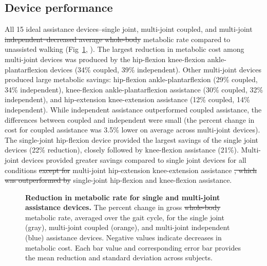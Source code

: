 \documentclass[10pt,letterpaper]{article}
\providecommand{\DIFaddtex}[1]{{\protect\color{blue}{#1}}} %
\providecommand{\DIFdeltex}[1]{{\protect\color{red}\sout{#1}}}                      %
\providecommand{\DIFaddbegin}{} %
\providecommand{\DIFaddend}{} %
\providecommand{\DIFdelbegin}{} %
\providecommand{\DIFdelend}{} %
\providecommand{\DIFaddFL}[1]{\DIFadd{#1}} %
\providecommand{\DIFdelFL}[1]{\DIFdel{#1}} %
\providecommand{\DIFaddbeginFL}{} %
\providecommand{\DIFaddendFL}{} %
\providecommand{\DIFdelbeginFL}{} %
\providecommand{\DIFdelendFL}{} %
\providecommand{\DIFadd}[1]{\texorpdfstring{\DIFaddtex{#1}}{#1}} %
\providecommand{\DIFdel}[1]{\texorpdfstring{\DIFdeltex{#1}}{}} %
\newcommand{\DIFscaledelfig}{0.5}
\newlength{\DIFdelgraphicswidth} %
\newlength{\DIFdelgraphicsheight} %
\newcommand{\DIFaddincludegraphics}[2][]{{\color{blue}\fbox{\DIFOincludegraphics[#1]{#2}}}} %
\newcommand{\DIFdelincludegraphics}[2][]{%
\sbox{\DIFdelgraphicsbox}{\DIFOincludegraphics[#1]{#2}}%
\settoboxwidth{\DIFdelgraphicswidth}{\DIFdelgraphicsbox} %
\settoboxtotalheight{\DIFdelgraphicsheight}{\DIFdelgraphicsbox} %
\scalebox{\DIFscaledelfig}{%
\parbox[b]{\DIFdelgraphicswidth}{\usebox{\DIFdelgraphicsbox}\\[-\baselineskip] \rule{\DIFdelgraphicswidth}{0em}}\llap{\resizebox{\DIFdelgraphicswidth}{\DIFdelgraphicsheight}{%
\setlength{\unitlength}{\DIFdelgraphicswidth}%
\begin{picture}(1,1)%
\thicklines\linethickness{2pt} %
{\color[rgb]{1,0,0}\put(0,0){\framebox(1,1){}}}%
{\color[rgb]{1,0,0}\put(0,0){\line( 1,1){1}}}%
{\color[rgb]{1,0,0}\put(0,1){\line(1,-1){1}}}%
\end{picture}%
}*{3pt}}} %
} %
\DeclareRobustCommand{\DIFaddbegin}{\DIFOaddbegin \let\includegraphics\DIFaddincludegraphics} %
\DeclareRobustCommand{\DIFaddend}{\DIFOaddend \let\includegraphics\DIFOincludegraphics} %
\DeclareRobustCommand{\DIFdelbegin}{\DIFOdelbegin \let\includegraphics\DIFdelincludegraphics} %
\DeclareRobustCommand{\DIFdelend}{\DIFOaddend \let\includegraphics\DIFOincludegraphics} %
\DeclareRobustCommand{\DIFaddbeginFL}{\DIFOaddbeginFL \let\includegraphics\DIFaddincludegraphics} %
\DeclareRobustCommand{\DIFaddendFL}{\DIFOaddendFL \let\includegraphics\DIFOincludegraphics} %
\DeclareRobustCommand{\DIFdelbeginFL}{\DIFOdelbeginFL \let\includegraphics\DIFdelincludegraphics} %
\DeclareRobustCommand{\DIFdelendFL}{\DIFOaddendFL \let\includegraphics\DIFOincludegraphics} %
\begin{document}
\subsection*{Device performance}
All 15 ideal assistance devices--single joint, multi-joint coupled, and multi-joint \DIFdelbegin \DIFdel{independent--decreased average whole-body }\DIFdelend \DIFaddbegin \DIFadd{independent--significantly decreased average total }\DIFaddend metabolic rate compared to unassisted walking (Fig~\ref{Fig1}, \DIFaddbegin \DIFadd{, }\DIFadd{; p \textless~0.05}\DIFaddend ). The largest reduction in metabolic cost among multi-joint devices was produced by the hip-flexion knee-flexion ankle-plantarflexion devices (34\% coupled, 39\% independent). Other multi-joint devices produced large metabolic savings: hip-flexion ankle-plantarflexion (29\% coupled, 34\% independent), knee-flexion ankle-plantarflexion assistance (30\% coupled, 32\% independent), and hip-extension knee-extension assistance (12\% coupled, 14\% independent). While independent assistance outperformed coupled assistance, the differences between coupled and independent were small (the percent change in cost for coupled assistance was 3.5\% lower on average across multi-joint devices). The single-joint hip-flexion device provided the largest savings of the single joint devices (22\% reduction), closely followed by knee-flexion assistance (21\%). Multi-joint devices provided greater savings compared to single joint devices for all conditions \DIFdelbegin \DIFdel{except for }\DIFdelend \DIFaddbegin \DIFadd{(Tukey post-hoc test, p \textless~0.05) except for two conditions. First, coupled and independent }\DIFaddend multi-joint hip-extension knee-extension assistance \DIFdelbegin \DIFdel{, which was outperformed by }\DIFdelend \DIFaddbegin \DIFadd{was not significantly different from }\DIFaddend single-joint hip-flexion and knee-flexion assistance. \DIFaddbegin \DIFadd{Second, coupled hip-flexion knee-flexion assistance was not significantly different from single-joint knee-flexion assistance.  
}\DIFaddend 

\begin{figure}[!h]
\begin{adjustwidth}{-1in}{0in} %
    \centering
    \caption{{\bf Reduction in metabolic rate for single and multi-joint assistance devices.}
        The percent change in gross \DIFdelbeginFL \DIFdelFL{whole-body }\DIFdelendFL \DIFaddbeginFL \DIFaddFL{total }\DIFaddendFL metabolic rate, averaged over the gait cycle, for the single joint (gray), multi-joint coupled (orange), and multi-joint independent (blue) assistance devices. Negative values indicate decreases in metabolic cost. Each bar value and corresponding error bar provides the mean reduction and standard deviation across subjects.}
\label{Fig1}
\end{adjustwidth}
\end{figure} 
\end{document}
